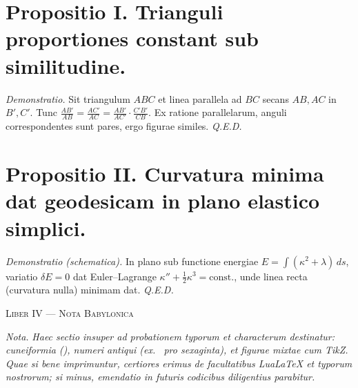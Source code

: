 \documentclass[12pt]{article}
\newcommand{\dingir}{\centerline{\Large \cunei{𒀭}}}
\newcommand{\divider}{\vspace{1em}\dingir\vspace{1em}}
\newcommand{\Liber}[1]{\vspace{1ex}\begin{center}\Large\textsc{Liber #1}\end{center}\vspace{-0.5ex}\dingir\vspace{0.5ex}}
\begin{document}
\section*{Propositio I. \; Trianguli proportiones constant sub similitudine.}

\textit{Demonstratio.} Sit triangulum $ABC$ et linea parallela ad $BC$ secans $AB, AC$ in $B', C'$. Tunc $\frac{AB'}{AB}=\frac{AC'}{AC}=\frac{A B'}{A C'}\cdot\frac{C'B'}{CB}$. Ex ratione parallelarum, anguli correspondentes sunt pares, ergo figurae similes. \textit{Q.E.D.}

\begin{center}
\end{center}

\section*{Propositio II. \; Curvatura minima dat geodesicam in plano elastico simplici.}

\textit{Demonstratio (schematica).} In plano sub functione energiae $E=\int (\kappa^2 + \lambda)\,ds$, variatio $\delta E=0$ dat Euler–Lagrange $\kappa''+\tfrac12\kappa^3=\text{const.}$, unde linea recta (curvatura nulla) minimam dat. \textit{Q.E.D.}

\begin{center}
\end{center}

\divider

\Liber{IV — Nota Babylonica}

\textit{Nota.} \; \textit{Haec sectio insuper ad probationem typorum et characterum destinatur: cuneiformia (), numeri antiqui (ex.\  pro sexaginta), et figurae mixtae cum TikZ. Quae si bene imprimuntur, certiores erimus de facultatibus Lua\LaTeX{} et typorum nostrorum; si minus, emendatio in futuris codicibus diligentius parabitur.}
\end{document}

